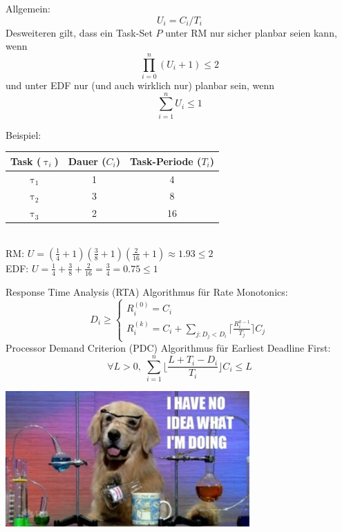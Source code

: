 \begin{frame}{\subsecname}
	Allgemein:
	\begin{equation}
		U_i = C_i / T_i
	\end{equation}
	Desweiteren gilt, dass ein Task-Set $P$ unter RM nur sicher planbar seien kann, wenn
	\begin{equation}
		\prod_{i=0}^n (U_i +1) \leq 2
	\end{equation}
	und unter EDF nur (und auch wirklich nur) planbar sein, wenn
	\begin{equation}
		\sum_{i=1}^n U_i \leq 1
	\end{equation}
\end{frame}

\begin{frame}{\subsecname}
	Beispiel:
	\begin{tabular}{c||c|c}
		Task ($\uptau_i$) & Dauer ($C_i$) & Task-Periode ($T_i$)\\\hline\hline
		$\uptau_1$ & 1 & 4\\
		$\uptau_2$ & 3 & 8\\
		$\uptau_3$ & 2 & 16
	\end{tabular}$ $\\[3ex]\pause
		RM:  $U = (\frac{1}{4}+1)(\frac{3}{8}+1)(\frac{2}{16}+1)\approx 1.93 \leq 2$\\[3ex]\pause
		EDF: $U = \frac{1}{4} + \frac{3}{8} + \frac{2}{16} = \frac{3}{4} = 0.75 \leq 1$
\end{frame}

\begin{frame}{\subsecname}
	Response Time Analysis (RTA) Algorithmus für Rate Monotonics:
	\begin{equation}
		D_i \geq
		\begin{cases}
   				R_i^{(0)}=C_i \\
   				R_i^{(k)}=C_i+ \sum_{j:D_j<D_i} \lceil \frac{R_i^{k-1}}{T_j}\rceil C_j
  		\end{cases}
	\end{equation}
	Processor Demand Criterion (PDC) Algorithmus für Earliest Deadline First:
	\begin{equation}
		\forall L > 0,\; \sum_{i=1}^n\lfloor \frac{L+T_i-D_i}{T_i}\rfloor C_i \leq L
	\end{equation}
\end{frame}

\begin{frame}
	\begin{center}
		\includegraphics[width=0.7\textwidth]{graphics/memes/sciencedog.jpg}
	\end{center}
\end{frame}


